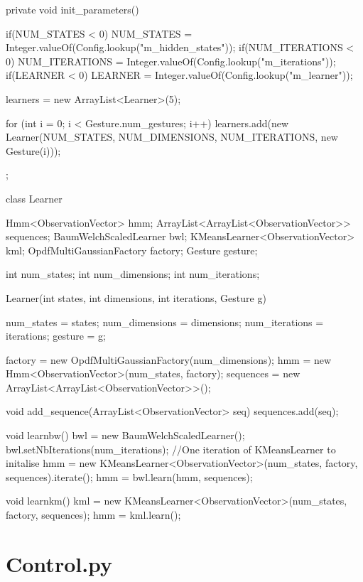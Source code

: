 \documentclass[12pt,a4,notitlepage]{report}
\renewcommand{\_}{\texttt{\symbol{95}}}
\newcommand{\<}{\texttt{\symbol{60}}}
\renewcommand{\>}{\texttt{\symbol{62}}}
\begin{document}
\begin{code}
{	private void init_parameters()
	{
		if(NUM_STATES < 0)
			NUM_STATES = Integer.valueOf(Config.lookup("m_hidden_states"));
		if(NUM_ITERATIONS < 0)
			NUM_ITERATIONS = Integer.valueOf(Config.lookup("m_iterations"));
		if(LEARNER < 0)
			LEARNER = Integer.valueOf(Config.lookup("m_learner"));

		learners = new ArrayList<Learner>(5);

		for (int i = 0; i < Gesture.num_gestures; i++)
		{
			learners.add(new Learner(NUM_STATES, NUM_DIMENSIONS, NUM_ITERATIONS,
				new Gesture(i)));
		}
	}
};

class Learner
{
	Hmm<ObservationVector> hmm;
	ArrayList<ArrayList<ObservationVector>> sequences;
	BaumWelchScaledLearner bwl;
	KMeansLearner<ObservationVector> kml; 
    OpdfMultiGaussianFactory factory;
    Gesture gesture;
    
	int num_states;
	int num_dimensions;
	int num_iterations;    

	Learner(int states, int dimensions, int iterations, Gesture g)
	{
		num_states = states;
		num_dimensions = dimensions;
		num_iterations = iterations;
		gesture = g;

		factory = new OpdfMultiGaussianFactory(num_dimensions);
		hmm = new Hmm<ObservationVector>(num_states, factory);
		sequences = new ArrayList<ArrayList<ObservationVector>>();
	}
	
	void add_sequence(ArrayList<ObservationVector> seq)
	{
		sequences.add(seq);
	}
	
	void learnbw()
	{
		bwl = new BaumWelchScaledLearner();
		bwl.setNbIterations(num_iterations);
		//One iteration of KMeansLearner to initalise
		hmm = new KMeansLearner<ObservationVector>(num_states, factory, sequences).iterate();
		hmm = bwl.learn(hmm, sequences);
	}
	
	void learnkm()
	{
		kml = new KMeansLearner<ObservationVector>(num_states, factory, sequences);
		hmm = kml.learn();
	}
}
\end{code}

\chapter{Control.py}
\end{document}
